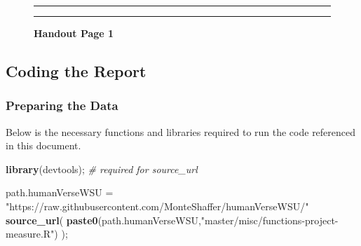\documentclass[]{article}
\newenvironment{Shaded}{\begin{snugshade}}{\end{snugshade}}
\newcommand{\CommentTok}[1]{\textcolor[rgb]{0.56,0.35,0.01}{\textit{#1}}}
\newcommand{\KeywordTok}[1]{\textcolor[rgb]{0.13,0.29,0.53}{\textbf{#1}}}
\newcommand{\NormalTok}[1]{#1}
\newcommand{\StringTok}[1]{\textcolor[rgb]{0.31,0.60,0.02}{#1}}
\begin{document}
\begin{figure}[!ht]
    \hrule
    \caption{ \textbf{Handout Page 1} }
    \begin{center}
    \end{center}
    \label{fig:handout-1}
    \hrule
\end{figure}

\newpage

\subsection{Coding the Report}
\label{sec:appendix-setup}

\subsubsection{Preparing the Data}
\label{sec:appendix-setup2}

Below is the necessary functions and libraries required to run the code
referenced in this document.

\begin{Shaded}
\begin{Highlighting}[]
\KeywordTok{library}\NormalTok{(devtools); }\CommentTok{# required for source_url}

\NormalTok{path.humanVerseWSU =}\StringTok{ "https://raw.githubusercontent.com/MonteShaffer/humanVerseWSU/"}
\KeywordTok{source_url}\NormalTok{( }\KeywordTok{paste0}\NormalTok{(path.humanVerseWSU,}\StringTok{"master/misc/functions-project-measure.R"}\NormalTok{) );}
\end{Highlighting}
\end{Shaded}
\end{document}
